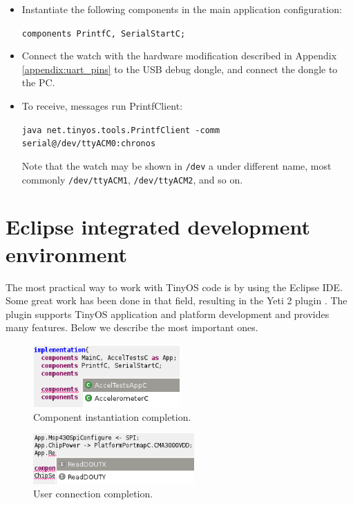 \begin{itemize}
  \item Instantiate the following components in the main application configuration:

  \texttt{components PrintfC, SerialStartC;}

  \item Connect the watch with the hardware modification described in Appendix \ref{appendix:uart_pins} to the USB debug dongle, and connect the dongle to the PC.

  \item To receive, messages run PrintfClient:

  \texttt{java net.tinyos.tools.PrintfClient -comm serial@/dev/ttyACM0:chronos}

  Note that the watch may be shown in \texttt{/dev} a under different name, most commonly \texttt{/dev/ttyACM1}, \texttt{/dev/ttyACM2}, and so on.

\end{itemize}

\section{Eclipse integrated development environment}

The most practical way to work with TinyOS code is by using the Eclipse IDE. Some great work has been done in that field, resulting in the Yeti 2 plugin \cite{Yeti2}. The plugin supports TinyOS application and platform development and provides many features. Below we describe the most important ones.

\begin{figure}[h]
  \centering
  \includegraphics[width=0.5\textwidth]{img/eclipse_compl1.png}
  \caption{Component instantiation completion.}
  \label{fig:first_compl}
\end{figure}

\begin{figure}[h]
  \centering
  \includegraphics[width=0.55\textwidth]{img/eclipse_compl2.png}
  \caption{User connection completion.}
\end{figure}

